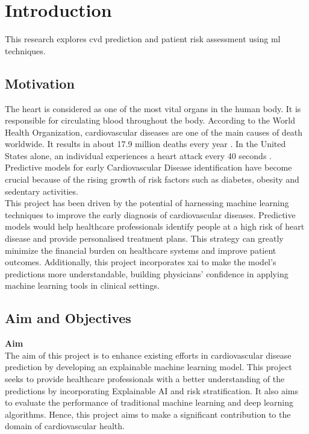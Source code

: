 \section{Introduction}
\label{sec:intro}

This research explores \gls{cvd} prediction and patient risk assessment using \gls{ml} techniques.

\subsection{Motivation}
\label{sec:intro_motiv}

The heart is considered as one of the most vital organs in the human body. It is responsible for circulating blood throughout the body. According to the World Health Organization, cardiovascular diseases are one of the main causes of death worldwide. It results in about 17.9 million deaths every year \citep{who2019cardiovascular}. In the United States alone, an individual experiences a heart attack every 40 seconds \citep{cdc2024heart}. Predictive models for early Cardiovascular Disease identification have become crucial because of the rising growth of risk factors such as diabetes, obesity and sedentary activities. \\
\noindent This project has been driven by the potential of harnessing machine learning techniques to improve the early diagnosis of cardiovascular diseases. Predictive models would help healthcare professionals identify people at a high risk of heart disease and provide personalised treatment plans. This strategy can greatly minimize the financial burden on healthcare systems and improve patient outcomes. Additionally, this project incorporates \gls{xai} to make the model’s predictions more understandable, building physicians’ confidence in applying machine learning tools in clinical settings.


\subsection{Aim and Objectives}
\label{sec:intro_aim}
\textbf{Aim } \\
The aim of this project is to enhance existing efforts in cardiovascular disease prediction by developing an explainable machine learning model. This project seeks to provide healthcare professionals with a better understanding of the predictions by incorporating Explainable AI and risk stratification. It also aims to evaluate the performance of traditional machine learning and deep learning algorithms. Hence, this project aims to make a significant contribution to the domain of cardiovascular health. \\

